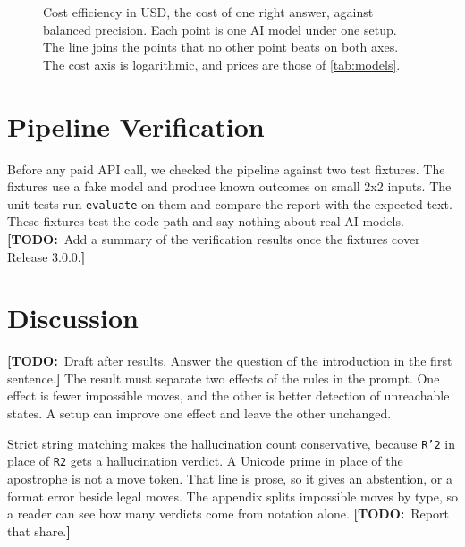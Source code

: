 \documentclass[10pt,twocolumn,letterpaper]{article}
\newcommand{\todo}[1]{{\color{red!70!black}\textbf{[TODO:}~#1\textbf{]}}}
\newcommand{\code}[1]{\texttt{#1}}
\begin{document}
\begin{figure}[!htbp]
\caption{Cost efficiency in USD, the cost of one right answer, against balanced precision. Each point is one AI model under one setup. The line joins the points that no other point beats on both axes. The cost axis is logarithmic, and prices are those of \cref{tab:models}.}
\label{fig:pareto}
\end{figure}

\section{Pipeline Verification}\label{sec:verification}
Before any paid API call, we checked the pipeline against two test fixtures. The fixtures use a fake model and produce known outcomes on small 2x2 inputs. The unit tests run \code{evaluate} on them and compare the report with the expected text. These fixtures test the code path and say nothing about real AI models. \todo{Add a summary of the verification results once the fixtures cover Release 3.0.0.}

\section{Discussion}\label{sec:discussion}
\todo{Draft after results. Answer the question of the introduction in the first sentence.} The result must separate two effects of the rules in the prompt. One effect is fewer impossible moves, and the other is better detection of unreachable states. A setup can improve one effect and leave the other unchanged.

Strict string matching makes the hallucination count conservative, because \code{R'2} in place of \code{R2} gets a hallucination verdict. A Unicode prime in place of the apostrophe is not a move token. That line is prose, so it gives an abstention, or a format error beside legal moves. The appendix splits impossible moves by type, so a reader can see how many verdicts come from notation alone. \todo{Report that share.}
\end{document}
